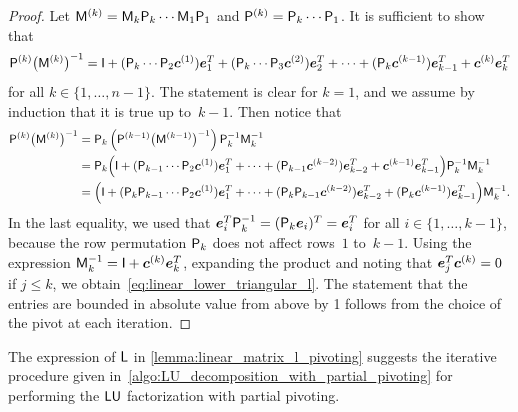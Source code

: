 \begin{proof}
    Let $\mathsf M^{(k)} = \mathsf M_{k} \mathsf P_{k} \dotsb \mathsf M_{1} \mathsf P_{1}$ and $\mathsf P^{(k)} = \mathsf P_{k} \dotsb \mathsf P_{1}$.
    It is sufficient to show that
    \begin{equation}
        \label{eq:linear_lower_triangular_l}
        \mathsf P^{(k)} \bigl( \mathsf M^{(k)} \bigr)^{-1}
        = \mathsf I
        + (\mathsf P_{k} \dotsb \mathsf P_{2} \mathbf{\boldsymbol{c}}^{(1)}) \mathbf{\boldsymbol{e}}_{1}^T
        + (\mathsf P_{k} \dotsb \mathsf P_{3} \mathbf{\boldsymbol{c}}^{(2)}) \mathbf{\boldsymbol{e}}_{2}^T
        + \dotsb
        + (\mathsf P_{k} \mathbf{\boldsymbol{c}}^{(k-1)}) \mathbf{\boldsymbol{e}}_{k-1}^T
        + \mathbf{\boldsymbol{c}}^{(k)} \mathbf{\boldsymbol{e}}_{k}^T
    \end{equation}
    for all $k \in \{1, \dotsc, n-1 \}$.
    The statement is clear for $k = 1$,
    and we assume by induction that it is true up to~$k-1$.
    Then notice that
    \begin{align*}
        \mathsf P^{(k)} \bigl( \mathsf M^{(k)} \bigr)^{-1}
        &= \mathsf P_{k} \left( \mathsf P^{(k-1)} \bigl( \mathsf M^{(k-1)} \bigr)^{-1} \right) \mathsf P_k^{-1} \mathsf M_k^{-1} \\
        &= \mathsf P_{k} \Bigl( \mathsf I
        + (\mathsf P_{k-1} \dotsb \mathsf P_{2} \mathbf{\boldsymbol{c}}^{(1)}) \mathbf{\boldsymbol{e}}_{1}^T
        + \dotsb
        + (\mathsf P_{k-1} \mathbf{\boldsymbol{c}}^{(k-2)}) \mathbf{\boldsymbol{e}}_{k-2}^T
        + \mathbf{\boldsymbol{c}}^{(k-1)} \mathbf{\boldsymbol{e}}_{k-1}^T \Bigr) \mathsf P_k^{-1} \mathsf M_k^{-1} \\
        &= \Bigl( \mathsf I
        + (\mathsf P_k \mathsf P_{k-1} \dotsb \mathsf P_{2} \mathbf{\boldsymbol{c}}^{(1)}) \mathbf{\boldsymbol{e}}_{1}^T
        + \dotsb
        + (\mathsf P_k \mathsf P_{k-1} \mathbf{\boldsymbol{c}}^{(k-2)}) \mathbf{\boldsymbol{e}}_{k-2}^T
        + (\mathsf P_k \mathbf{\boldsymbol{c}}^{(k-1)}) \mathbf{\boldsymbol{e}}_{k-1}^T \Bigr) \mathsf M_k^{-1}.
    \end{align*}
    In the last equality,
    we used that $\mathbf{\boldsymbol{e}}_{i}^T \mathsf P_k^{-1} = (\mathsf P_k \mathbf{\boldsymbol{e}}_i)^T = \mathbf{\boldsymbol{e}}_i^T$ for all $i \in \{1, \dotsc, k-1\}$,
    because the row permutation $\mathsf P_k$ does not affect rows~$1$ to~$k-1$.
    Using the expression $\mathsf M_k^{-1} = \mathsf I + \mathbf{\boldsymbol{c}}^{(k)} \mathbf{\boldsymbol{e}}_k^T$,
    expanding the product and noting that $\mathbf{\boldsymbol{e}}_j^T \mathbf{\boldsymbol{c}}^{(k)} = 0$ if $j \leq k$,
    we obtain~\eqref{eq:linear_lower_triangular_l}.
    The statement that the entries are bounded in absolute value from above by 1 follows from the choice of the pivot at each iteration.
\end{proof}
The expression of $\mathsf L$ in \cref{lemma:linear_matrix_l_pivoting} suggests the iterative procedure given in~\cref{algo:LU_decomposition_with_partial_pivoting} for performing the $\mathsf L \mathsf U$ factorization with partial pivoting.
